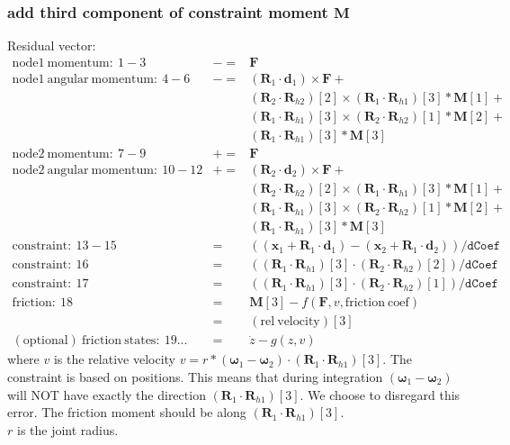 \documentclass[10pt,fleqn,subeqn]{report}
\newcommand{\T}[1]{\bm{#1}}
\begin{document}
\subsubsection{add third component of constraint moment $\T M$}
Residual vector:
\begin{eqnarray*}
	\mathrm{node1\ momentum}:\ 1-3& -= & \T F\\
	\mathrm{node1\ angular\ momentum}:\ 4-6& -= & 
		(\T R_1\cdot \T d_1) \times \T F + \\
	&&	(\T R_2\cdot \T R_{h2})[2]\times 
		(\T R_1\cdot \T R_{h1})[3]*\T M[1] +\\
	&&	(\T R_1\cdot \T R_{h1})[3]\times
		(\T R_2\cdot \T R_{h2})[1]*\T M[2] +\\
	&&	(\T R_1\cdot \T R_{h1})[3]*\T M[3]\\
	\mathrm{node2\ momentum}:\ 7-9& += & \T F\\
	\mathrm{node2\ angular\ momentum}:\ 10-12& += & 
		(\T R_2\cdot \T d_2) \times \T F + \\
	&&	(\T R_2\cdot \T R_{h2})[2]\times 
		(\T R_1\cdot \T R_{h1})[3]*\T M[1] +\\
	&&	(\T R_1\cdot \T R_{h1})[3]\times
		(\T R_2\cdot \T R_{h2})[1]*\T M[2] +\\
	&&	(\T R_1\cdot \T R_{h1})[3]*\T M[3]\\
	\mathrm{constraint}:\ 13-15& = &  ((\T x_1+\T R_1\cdot \T d_1) - 
			(\T x_2+\T R_1\cdot \T d_2))/\texttt{dCoef}\\
	\mathrm{constraint}:\ 16& = &  ((\T R_1\cdot \T R_{h1})[3]\cdot 
			(\T R_2\cdot \T R_{h2})[2])/\texttt{dCoef}\\
	\mathrm{constraint}:\ 17& = &  ((\T R_1\cdot \T R_{h1})[3]\cdot 
			(\T R_2\cdot \T R_{h2})[1])/\texttt{dCoef}\\
	\mathrm{friction:}\ 18& = &  \T M[3] -f(\T F, v, 
			\mathrm{friction\ coef})\\
		& = &  (\mathrm{rel\ velocity})[3]\\
	\mathrm{(optional)\ friction\ states:}\ 19...& = &  \dot{z} - g(z,v)
\end{eqnarray*}
where $v$ is the relative velocity
$v = r * (\T \omega_{1}-\T \omega_{2})\cdot(\T R_1\cdot \T R_{h1})[3]$.
The constraint is based on positions. This means that during integration 
$(\T \omega_{1}-\T \omega_{2})$ will NOT have exactly the
direction $(\T R_1\cdot \T R_{h1})[3]$. We choose to disregard this error.
The friction moment should be along $(\T R_1\cdot \T R_{h1})[3]$.\\
$r$ is the joint radius.\\
\end{document}
